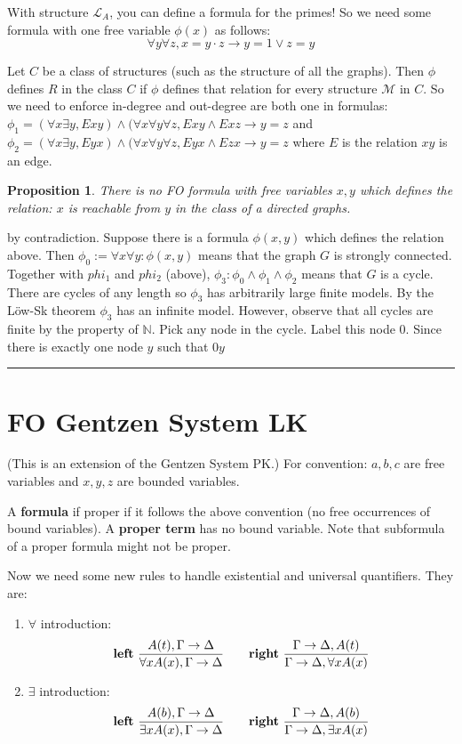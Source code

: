 \documentclass[twoside]{article}
\newtheorem{proposition}[theorem]{Proposition}
\newenvironment{proof}{{\bf Proof:}}{\hfill\rule{2mm}{2mm}}
\def\N{\mathbb{N}}
\def\M{\mathcal{M}}
\begin{document}
With structure $\mathcal{L}_A$, you can define a formula for the primes! So we need some formula with one free variable $\phi(x)$ as follows: 
\[\forall y\forall z, x = y\cdot z \rightarrow y = 1 \lor z = y\]

Let $C$ be a class of structures (such as the structure of all the graphs). Then $\phi$ defines $R$ in the class $C$ if $\phi$ defines that relation for every structure $\M$ in $C$. So we need to enforce in-degree and out-degree are both one in formulas: $\phi_1 = (\forall x \exists y, Exy) \land (\forall x \forall y \forall z, Exy \land Exz \rightarrow y = z$ and $\phi_2 = (\forall x \exists y, Eyx) \land (\forall x \forall y \forall z, Eyx \land Ezx \rightarrow y = z$ where $E$ is the relation $xy$ is an edge. 
\begin{proposition}
There is no FO formula with free variables $x, y$ which defines the relation:
\emph{$x$ is reachable from $y$} in the class of a directed graphs.
\end{proposition}
\begin{proof}
by contradiction. Suppose there is a formula $\phi(x,y)$ which defines the relation above. Then $\phi_0 := \forall x\forall y: \phi(x,y)$ means that the graph $G$ is strongly connected. Together with $phi_1$ and $phi_2$ (above), $\phi_3: \phi_0 \land \phi_1 \land \phi_2$ means that $G$ is a cycle. There are cycles of any length so $\phi_3$ has arbitrarily large finite models. By the L\"{o}w-Sk theorem $\phi_3$ has an infinite model. However, observe that all cycles are finite by the property of $\N$. Pick any node in the cycle. Label this node $0$. Since there is exactly one node $y$ such that $0y$ 
\end{proof}

\section{FO Gentzen System LK}
(This is an extension of the Gentzen System PK.) For convention: $a,b,c$ are free variables and $x,y,z$ are bounded variables.

A \textbf{formula} if proper if it follows the above convention (no free occurrences of bound variables). A \textbf{proper term} has no bound variable. Note that subformula of a proper formula might not be proper.

Now we need some new rules to handle existential and universal quantifiers. They are:
\begin{enumerate}
\item $\forall$ introduction:
\[\mbox{\textbf{left} } \frac{A(t), \Gamma \rightarrow \Delta}{\forall x A(x), \Gamma \rightarrow \Delta} \qquad \mbox{\textbf{right} } 
\frac{\Gamma \rightarrow \Delta, A(t)}{\Gamma \rightarrow \Delta, \forall x A(x)} \]  
\item $\exists$ introduction:
\[\mbox{\textbf{left} } \frac{A(b), \Gamma \rightarrow \Delta}{\exists x A(x), \Gamma \rightarrow \Delta} \qquad \mbox{\textbf{right} } 
\frac{\Gamma \rightarrow \Delta, A(b)}{\Gamma \rightarrow \Delta, \exists x A(x)} \]  
\end{enumerate}   
\end{document}
